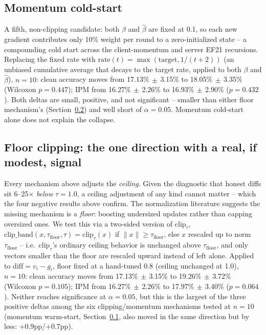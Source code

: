 \documentclass{article}
\begin{document}
\subsection{Momentum cold-start}
\label{sec:momentum}

A fifth, non-clipping candidate: both $\beta$ and $\hat\beta$ are fixed at 0.1,
so each new gradient contributes only 10\% weight per round to a
zero-initialized state -- a compounding cold start across the client-momentum
and server EF21 recursions. Replacing the fixed rate with $\mathrm{rate}(t) =
\max(\mathrm{target}, 1/(t{+}2))$ (an unbiased cumulative average that decays to
the target rate, applied to both $\beta$ and $\hat\beta$), $n{=}10$: clean
accuracy moves from 17.13\%$\,\pm\,$3.15\% to 18.05\%$\,\pm\,$3.35\%
(Wilcoxon $p{=}0.447$); IPM from 16.27\%$\,\pm\,$2.26\% to
16.93\%$\,\pm\,$2.90\% ($p{=}0.432$). Both deltas are small, positive, and not
significant -- smaller than either floor mechanism's (Section~\ref{sec:floor})
and well short of $\alpha{=}0.05$. Momentum cold-start alone does not explain
the collapse.

\subsection{Floor clipping: the one direction with a real, if modest, signal}
\label{sec:floor}

Every mechanism above adjusts the \emph{ceiling}. Given the diagnostic that
honest diffs sit 6--25$\times$ \emph{below} $\tau{=}1.0$, a ceiling adjustment of
any kind cannot matter -- which the four negative results above confirm. The
normalization literature \citep{zuo2025fedNGA,sun2024gradnorm} suggests the
missing mechanism is a \emph{floor}: boosting undersized updates rather than
capping oversized ones. We test this via a two-sided version of $\mathrm{clip}_\tau$,
$\mathrm{clip\_band}(x, \tau_{\mathrm{floor}}, \tau) = \mathrm{clip}_\tau(x)$ if
$\lVert x \rVert \geq \tau_{\mathrm{floor}}$, else $x$ rescaled up to norm
$\tau_{\mathrm{floor}}$ -- i.e.\ $\mathrm{clip}_\tau$'s ordinary ceiling behavior
is unchanged above $\tau_{\mathrm{floor}}$, and only vectors smaller than the
floor are rescaled upward instead of left alone. Applied to $\mathrm{diff} =
v_i - g_i$, floor fixed at a hand-tuned 0.8 (ceiling unchanged at 1.0),
$n{=}10$: clean accuracy moves from
17.13\%$\,\pm\,$3.15\% to 19.26\%$\,\pm\,$3.72\% (Wilcoxon $p{=}0.105$); IPM from
16.27\%$\,\pm\,$2.26\% to 17.97\%$\,\pm\,$3.40\% ($p{=}0.064$). Neither reaches
significance at $\alpha{=}0.05$, but this is the largest of the three positive
deltas among the six clipping/momentum mechanisms tested at $n{=}10$ (momentum
warm-start, Section~\ref{sec:momentum}, also moved in the same direction but by
less: +0.9pp/+0.7pp).
\end{document}
